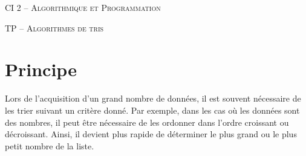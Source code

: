 \documentclass[11pt,oneside]{article}
\begin{document}
\pagestyle{fancy}
\renewcommand{\headrulewidth}{0pt}

\fancyhead{}

\fancyhead[C]{\rule{12cm}{.5pt}}


\renewcommand{\footrulewidth}{0.2pt}

\fancyfoot[C]{\footnotesize{\bfseries \thepage}}



\begin{center}
 \huge\textsc{CI 2 -- Algorithmique et Programmation}

\end{center}

\begin{center}
 \LARGE\textsc{TP -- Algorithmes de tris}
\end{center}

\section{Principe}

Lors de l'acquisition d'un grand nombre de données, il est souvent nécessaire de les trier suivant un critère donné. Par exemple, dans les cas où les données sont des nombres, il peut être nécessaire de les ordonner dans l'ordre croissant ou décroissant. Ainsi, il devient plus rapide de déterminer le plus grand ou le plus petit nombre de la liste. 
\end{document}
